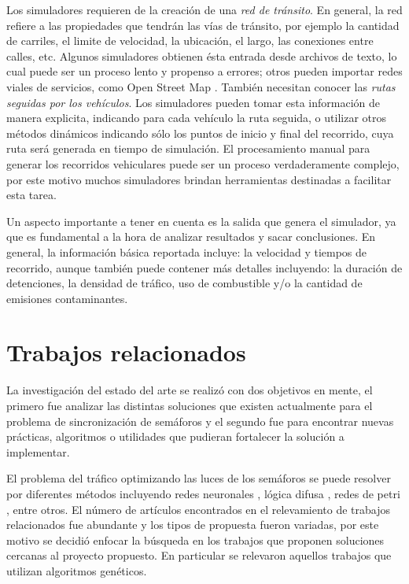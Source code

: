 Los simuladores requieren de la creación de una \emph{red de tránsito}. En general, la red refiere a las propiedades que tendrán las vías de tránsito, por ejemplo la cantidad de carriles, el limite de velocidad, la ubicación, el largo, las conexiones entre calles, etc. Algunos simuladores obtienen ésta entrada desde archivos de texto, lo cual puede ser un proceso lento y propenso a errores; otros pueden importar redes viales de servicios, como Open Street Map \citep{OSM}. También necesitan conocer las\emph{ rutas seguidas por los vehículos}. Los simuladores pueden tomar esta información de manera explicita, indicando para cada vehículo la ruta seguida, o utilizar otros métodos dinámicos indicando sólo los puntos de inicio y final del recorrido, cuya ruta será generada en tiempo de simulación. El procesamiento manual para generar los recorridos vehiculares puede ser un proceso verdaderamente complejo, por este motivo muchos simuladores brindan herramientas destinadas a facilitar esta tarea.

Un aspecto importante a tener en cuenta es la salida que genera el simulador, ya que es fundamental a la hora de analizar resultados y sacar conclusiones. En general, la información básica reportada incluye: la velocidad y tiempos de recorrido, aunque también puede contener más detalles incluyendo: la duración de detenciones, la densidad de tráfico, uso de combustible y/o la cantidad de emisiones contaminantes.  
 
\section{Trabajos relacionados}

La investigación del estado del arte se realizó con dos objetivos en mente, el primero fue analizar las distintas soluciones que existen actualmente para el problema de sincronización de semáforos y el segundo fue para encontrar nuevas prácticas, algoritmos o utilidades que pudieran fortalecer la solución a implementar.

El problema del tráfico optimizando las luces de los semáforos se puede resolver por diferentes métodos incluyendo  redes neuronales \citep{Lopez1999}, lógica difusa \citep{Lim2001}, redes de petri \citep{DiFebbraro2002}, entre otros. El número de artículos encontrados en el relevamiento de trabajos relacionados fue abundante y los tipos de propuesta fueron variadas, por este motivo se decidió enfocar la búsqueda en los trabajos que proponen soluciones cercanas al proyecto propuesto. En particular se relevaron aquellos trabajos que utilizan algoritmos genéticos.

